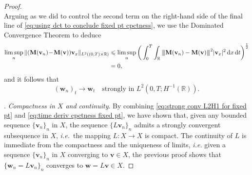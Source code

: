 \documentclass[10pt,a4paper]{amsart}
\newcommand{\bM}{\mathbf{M}}
\newcommand{\bv}{\mathbf{v}}
\newcommand{\bw}{\mathbf{w}}
\newcommand{\vertiii}[1]{{\left\vert\kern-0.25ex\left\vert\kern-0.25ex\left\vert #1 
    \right\vert\kern-0.25ex\right\vert\kern-0.25ex\right\vert}}
\renewcommand{\d}{\, \mathrm{d}}
\renewcommand{\leq}{\leqslant}
\begin{document}
\begin{proof}
\begin{equation*}
\end{equation*}
Arguing as we did to control the second term on the right-hand side of the final line of \eqref{eq:using dct to conclude fixed pt cpctness}, we use the Dominated Convergence Theorem to deduce
\begin{align*}
    \limsup_n \Vert (\bM(\bv_n)\! -\! \bM(\bv) ) \bv_x\Vert_{L^2((0,T)\times\mathbb{R})} 
    &\leq \limsup_n \bigg(\int_0^T \int_\mathbb{R} \vertiii{\bM(\bv_n) - \bM(\bv)}^2 |\bv_x|^2 \d x \d t \bigg)^{\frac{1}{2}} \\ 
    &= 0, 
\end{align*}
and it follows that 
\begin{equation}\label{eq:time deriv cpctness fixed pt}
    (\bw_n)_t \to \bw_t  \quad \text{strongly in } L^2(0,T;H^{-1}(\mathbb{R})). 
\end{equation}

\smallskip 
{}. \textit{Compactness in $X$ and continuity}. By combining \eqref{eq:strong conv L2H1 for fixed pt} and \eqref{eq:time deriv cpctness fixed pt}, we have shown that, given any bounded sequence $\{\bv_n\}_n$ in $X$, the sequence $\{L\bv_n \}_n$ admits a strongly convergent subsequence in $X$, \textit{i.e.}~the mapping $L:X \to X$ is compact. The continuity of $L$ is immediate from the compactness and the uniqueness of limits, \textit{i.e.} given a sequence $\{\bv_n \}_n$ in $X$ converging to $\bv \in X$, the previous proof shows that $\{\bw_n=L\bv_n\}_n$ converges to $\bw=L\bv \in X$. 
\end{proof}
\end{document}
